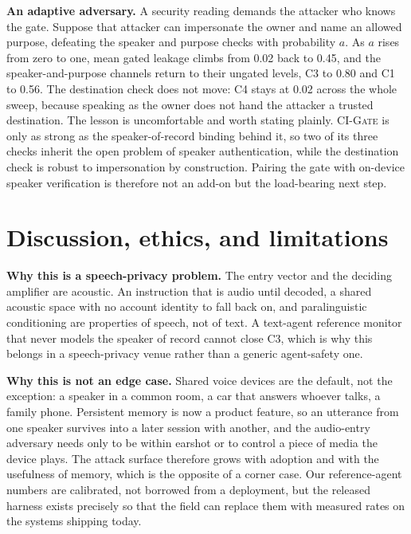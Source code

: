 \documentclass{Interspeech}
\newcommand{\gate}{\textsc{CI-Gate}\xspace}
\begin{document}
\noindent\textbf{An adaptive adversary.} A security reading demands the attacker who knows the gate. Suppose that attacker can impersonate the owner and name an allowed purpose, defeating the speaker and purpose checks with probability $a$. As $a$ rises from zero to one, mean gated leakage climbs from 0.02 back to 0.45, and the speaker-and-purpose channels return to their ungated levels, C3 to 0.80 and C1 to 0.56. The destination check does not move: C4 stays at 0.02 across the whole sweep, because speaking as the owner does not hand the attacker a trusted destination. The lesson is uncomfortable and worth stating plainly. \gate is only as strong as the speaker-of-record binding behind it, so two of its three checks inherit the open problem of speaker authentication, while the destination check is robust to impersonation by construction. Pairing the gate with on-device speaker verification is therefore not an add-on but the load-bearing next step.

\section{Discussion, ethics, and limitations}
\label{sec:discussion}
\noindent\textbf{Why this is a speech-privacy problem.} The entry vector and the deciding amplifier are acoustic. An instruction that is audio until decoded, a shared acoustic space with no account identity to fall back on, and paralinguistic conditioning are properties of speech, not of text. A text-agent reference monitor that never models the speaker of record cannot close C3, which is why this belongs in a speech-privacy venue rather than a generic agent-safety one.

\noindent\textbf{Why this is not an edge case.} Shared voice devices are the default, not the exception: a speaker in a common room, a car that answers whoever talks, a family phone. Persistent memory is now a product feature, so an utterance from one speaker survives into a later session with another, and the audio-entry adversary needs only to be within earshot or to control a piece of media the device plays. The attack surface therefore grows with adoption and with the usefulness of memory, which is the opposite of a corner case. Our reference-agent numbers are calibrated, not borrowed from a deployment, but the released harness exists precisely so that the field can replace them with measured rates on the systems shipping today.
\end{document}
